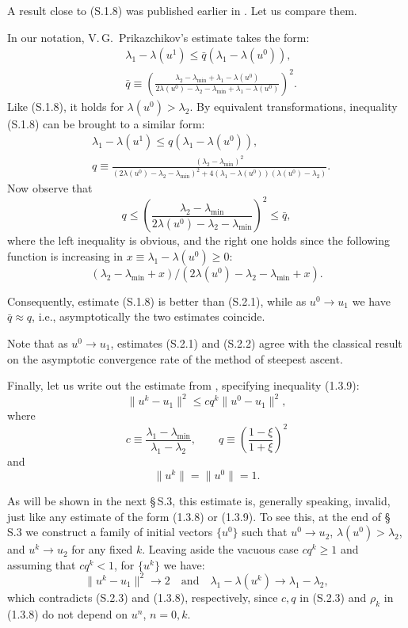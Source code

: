 \documentclass[11pt,oneside]{book}
\begin{document}
A result close to (S.1.8) was published earlier in \citep{Prikazchikov1975}. Let us compare them.

In our notation, V.\,G.~Prikazchikov's estimate takes the form:
\[
\begin{aligned}
&\lambda_1 - \lambda(u^1) \leqslant \bar{q}(\lambda_1 - \lambda(u^0)), \\
&\bar{q} \equiv \left( \frac{\lambda_2 - \lambda_{\min} + \lambda_1 - \lambda(u^0)}{2\lambda(u^0) - \lambda_2 - \lambda_{\min} + \lambda_1 - \lambda(u^0)} \right)^2.
\end{aligned}
\tag{S.2.1}
\]
Like (S.1.8), it holds for $\lambda(u^0) > \lambda_2$. By equivalent transformations, inequality (S.1.8) can be brought to a similar form:
\[
\begin{aligned}
&\lambda_1 - \lambda(u^1) \leqslant q(\lambda_1 - \lambda(u^0)), \\
&q \equiv \frac{(\lambda_2 - \lambda_{\min})^2}{(2\lambda(u^0) - \lambda_2 - \lambda_{\min})^2 + 4(\lambda_1 - \lambda(u^0))(\lambda(u^0) - \lambda_2)}.
\end{aligned}
\tag{S.2.2}
\]
Now observe that
\[
q \leqslant \left( \frac{\lambda_2 - \lambda_{\min}}{2\lambda(u^0) - \lambda_2 - \lambda_{\min}} \right)^2 \leqslant \bar{q},
\]
where the left inequality is obvious, and the right one holds since the following function is increasing in $x \equiv \lambda_1 - \lambda(u^0) \geqslant 0$:
\[
(\lambda_2 - \lambda_{\min} + x) / (2\lambda(u^0) - \lambda_2 - \lambda_{\min} + x).
\]

Consequently, estimate (S.1.8) is better than (S.2.1), while as $u^0 \to u_1$ we have $\bar{q} \approx q$, i.e., asymptotically the two estimates coincide.

Note that as $u^0 \to u_1$, estimates (S.2.1) and (S.2.2) agree with the classical result \citep{KantorovichAkilov1984} on the asymptotic convergence rate of the method of steepest ascent.

Finally, let us write out the estimate from \citep{CullumWilloughby1985}, specifying inequality (1.3.9):
\[
\|u^k - u_1\|^2 \leqslant c q^k \|u^0 - u_1\|^2, \tag{S.2.3}
\]
where
\[
c \equiv \frac{\lambda_1 - \lambda_{\min}}{\lambda_1 - \lambda_2}, \qquad q \equiv \left( \frac{1 - \xi}{1 + \xi} \right)^2
\]
and
\[
\|u^k\| = \|u^0\| = 1.
\]

As will be shown in the next \S\,S.3, this estimate is, generally speaking, invalid, just like any estimate of the form (1.3.8) or (1.3.9). To see this, at the end of \S\,S.3 we construct a family of initial vectors $\{u^0\}$ such that $u^0 \to u_2$, $\lambda(u^0) > \lambda_2$, and $u^k \to u_2$ for any fixed $k$. Leaving aside the vacuous case $c q^k \geqslant 1$ and assuming that $c q^k < 1$, for $\{u^k\}$ we have:
\[
\|u^k - u_1\|^2 \to 2 \quad \text{and} \quad \lambda_1 - \lambda(u^k) \to \lambda_1 - \lambda_2,
\]
which contradicts (S.2.3) and (1.3.8), respectively, since $c, q$ in (S.2.3) and $\rho_k$ in (1.3.8) do not depend on $u^n$, $n = 0, k$.
\end{document}
